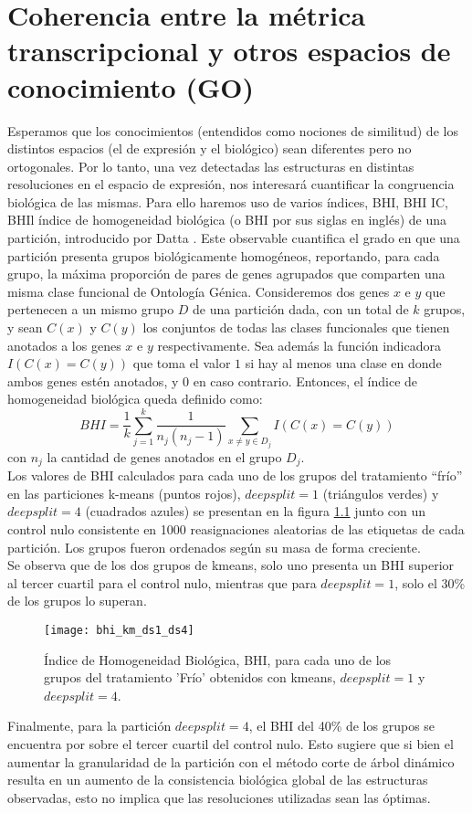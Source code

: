 \chapter{Coherencia entre la métrica transcripcional y otros espacios de conocimiento (GO)}
Esperamos que los conocimientos (entendidos como nociones de similitud) de los distintos espacios (el de expresión y el biológico) sean diferentes pero no ortogonales. Por lo tanto, una vez detectadas las estructuras en distintas resoluciones en el espacio de expresión, nos interesará cuantificar la congruencia biológica de las mismas. Para ello haremos uso de varios índices, BHI, BHI IC, BHIl índice de homogeneidad biológica (o BHI por sus siglas en inglés) de una partición, introducido por Datta \cite{Datta2006}. Este observable cuantifica el grado en que una partición presenta grupos biológicamente homogéneos, reportando, para cada grupo, la máxima proporción de pares de genes agrupados que comparten una misma clase funcional de Ontología Génica. Consideremos dos genes $x$ e $y$ que pertenecen a un mismo grupo $D$ de una partición dada, con un total de $k$ grupos, y sean $C(x)$ y $C(y)$ los conjuntos de todas las clases funcionales que tienen anotados a los genes $x$ e $y$ respectivamente. Sea además la función indicadora $I(C(x)=C(y))$ que toma el valor $1$ si hay al menos una clase en donde ambos genes estén anotados, y $0$ en caso contrario. Entonces, el índice de homogeneidad biológica queda definido como:
\begin{equation}
	BHI = \frac{1}{k}\sum\limits_{j=1}^k\frac{1}{n_j(n_j-1)}\sum\limits_{x\neq y\in D_j}I(C(x)=C(y))
\end{equation}
con $n_j$ la cantidad de genes anotados en el grupo $D_j$.\\
Los valores de BHI calculados para cada uno de los grupos del tratamiento ``frío'' en las particiones k-means (puntos rojos), $deepsplit=1$ (triángulos verdes) y $deepsplit=4$ (cuadrados azules) se presentan en la figura \ref{fig:bhi_km_ds1_ds4} junto con un control nulo consistente en 1000 reasignaciones aleatorias de las etiquetas de cada partición. Los grupos fueron ordenados según su masa de forma creciente.\\
Se observa que de los dos grupos de kmeans, solo uno presenta un BHI superior al tercer cuartil para el control nulo, mientras que para $deepsplit=1$, solo el 30\% de los grupos lo superan.
\begin{figure}[h]
    \centering
    \texttt{[image: bhi\_km\_ds1\_ds4]}
    \caption{Índice de Homogeneidad Biológica, BHI, para cada uno de los grupos del tratamiento 'Frío' obtenidos con kmeans, $deepsplit=1$ y $deepsplit=4$.}
    \label{fig:bhi_km_ds1_ds4}
\end{figure}
Finalmente, para la partición $deepsplit=4$, el BHI del 40\% de los grupos se encuentra por sobre el tercer cuartil del control nulo. Esto sugiere que si bien el aumentar la granularidad de la partición con el método corte de árbol dinámico resulta en un aumento de la consistencia biológica global de las estructuras observadas, esto no implica que las resoluciones utilizadas sean las óptimas.
